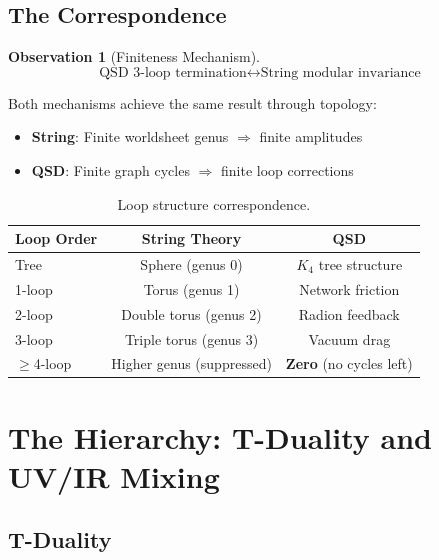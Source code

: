 \documentclass[11pt,a4paper]{article}
\theoremstyle{definition}
\newtheorem{observation}[theorem]{Observation}
\begin{document}
\subsection{The Correspondence}

\begin{observation}[Finiteness Mechanism]
\begin{equation}
\text{QSD 3-loop termination} \longleftrightarrow \text{String modular invariance}
\end{equation}
\end{observation}

Both mechanisms achieve the same result through topology:
\begin{itemize}[nosep]
    \item \textbf{String}: Finite worldsheet genus $\Rightarrow$ finite amplitudes
    \item \textbf{QSD}: Finite graph cycles $\Rightarrow$ finite loop corrections
\end{itemize}

\begin{table}[h]
\centering
\begin{tabular}{lcc}
\toprule
\textbf{Loop Order} & \textbf{String Theory} & \textbf{QSD} \\
\midrule
Tree & Sphere (genus 0) & $K_4$ tree structure \\
1-loop & Torus (genus 1) & Network friction \\
2-loop & Double torus (genus 2) & Radion feedback \\
3-loop & Triple torus (genus 3) & Vacuum drag \\
$\geq$4-loop & Higher genus (suppressed) & \textbf{Zero} (no cycles left) \\
\bottomrule
\end{tabular}
\caption{Loop structure correspondence.}
\end{table}

\section{The Hierarchy: T-Duality and UV/IR Mixing}
\label{sec:hierarchy}

\subsection{T-Duality}
\end{document}
